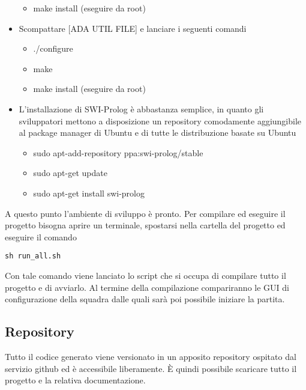 \begin{itemize}
\begin{itemize}
			\item[] make install (eseguire da root)
		\end{itemize}
	\item Scompattare [ADA UTIL FILE] e lanciare i seguenti comandi
		\begin{itemize}
			\item[] ./configure
			\item[] make
			\item[] make install (eseguire da root)
		\end{itemize}
	\item L'installazione di SWI-Prolog \`{e} abbastanza semplice, in quanto gli sviluppatori mettono a disposizione un repository comodamente aggiungibile al package manager di Ubuntu e di tutte le distribuzione basate su Ubuntu 
		\begin{itemize}
			\item[] sudo apt-add-repository ppa:swi-prolog/stable
			\item[] sudo apt-get update
			\item[] sudo apt-get install swi-prolog
		\end{itemize}
\end{itemize}

\noindent A questo punto l'ambiente di sviluppo \`{e} pronto. Per compilare ed eseguire il progetto bisogna aprire un terminale, spostarsi nella cartella del progetto ed eseguire il comando\\

\begin{center}
	\verb+sh run_all.sh+\\
\end{center}

Con tale comando viene lanciato lo script che si occupa di compilare tutto il progetto e di avviarlo. Al termine della compilazione compariranno le GUI di configurazione della squadra dalle quali sar\`{a} poi possibile iniziare la partita.

\subsection{Repository}
Tutto il codice generato viene versionato in un apposito repository ospitato dal servizio github ed è accessibile liberamente. \`{E} quindi possibile scaricare tutto il progetto e la relativa documentazione. 

